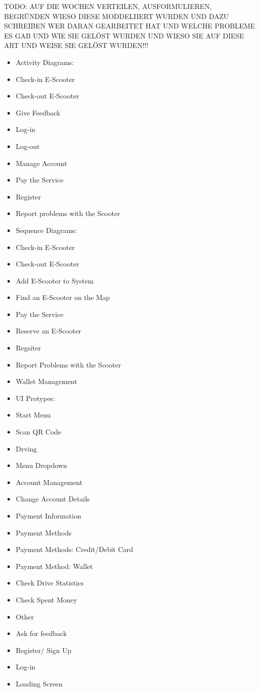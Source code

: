 \documentclass[a4paper, 12pt]{article}
\begin{document}
\color{red}TODO: AUF DIE WOCHEN VERTEILEN, AUSFORMULIEREN, BEGRÜNDEN WIESO DIESE MODDELIIERT WURDEN UND DAZU SCHREIBEN WER DARAN GEARBEITET HAT UND WELCHE PROBLEME ES GAB UND WIE SIE GELÖST WURDEN UND WIESO SIE AUF DIESE ART UND WEISE SIE GELÖST WURDEN!!!
\begin{itemize}
\item Activity Diagrams:
  \item Check-in E-Scooter
  \item Check-out E-Scooter
  \item Give Feedback
  \item Log-in
  \item Log-out
  \item Manage Account
  \item Pay the Service
  \item Register
  \item Report problems with the Scooter
  
\item Sequence Diagrams:
  \item Check-in E-Scooter
  \item Check-out E-Scooter
  \item Add E-Scooter to System
  \item Find an E-Scooter on the Map
  \item Pay the Service
  \item Reserve an E-Scooter
  \item Regsiter
  \item Report Problems with the Scooter
  \item Wallet Management
    
\item UI Protypes: 
  \item Start Menu
  \item Scan QR Code
  \item Drving
  \item Menu Dropdown
  \item Account Management
  \item Change Account Details
  \item Payment Information
  \item Payment Methods
  \item Payment Methods: Credit/Debit Card
  \item Payment Method: Wallet
  \item Check Drive Statistics
  \item Check Spent Money
  \item Other
  \item Ask for feedback
  \item Register/ Sign Up
  \item Log-in
  \item Loading Screen
\end{itemize}
\color{black}
\end{document}
